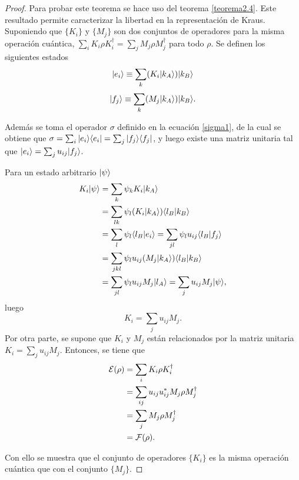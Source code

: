 \begin{proof}
Para probar este teorema se hace uso del teorema {\ref{teorema2.4}}. Este resultado permite caracterizar la libertad en la representación de Kraus. Suponiendo que $\{K_i\}$ y $\{M_j\}$ son dos conjuntos de operadores para la misma operación cuántica, $\sum_i K_i \rho K_i^\dagger= \sum_j M_j \rho M_j^\dagger$ para todo $\rho$. Se definen los siguientes estados
\begin{equation}
    |e_i\rangle\equiv \sum_k (K_i|k_A\rangle)|k_B\rangle
\end{equation}
\begin{equation}
    |f_j\rangle\equiv \sum_k (M_j|k_A\rangle)|k_B\rangle.
\end{equation}


Además se toma el operador $\sigma$ definido en la ecuación {\ref{sigma1}}, de la cual se obtiene que $\sigma=\sum_i|e_i \rangle \langle e_i|=\sum_j |f_j\rangle \langle f_j|$, y luego existe una matriz unitaria tal que $  |e_i\rangle=\sum_{j}u_{ij}|f_j\rangle$.

Para un estado arbitrario $|\psi\rangle$ 
\begin{equation}
    \begin{split}
        K_i|\psi\rangle&=\sum_k \psi_k K_i|k_A\rangle\\
                   &= \sum_{lk}\psi_l(K_i|k_A\rangle)\langle l_B |k_B\rangle\\
                   &=\sum_{l}\psi_l\langle l_B| e_i\rangle=\sum_{jl}\psi_l u_{ij}\langle l_B|f_j\rangle\\
                   &=\sum_{jkl}\psi_l u_{ij}(M_j|k_A\rangle)\langle l_B|k_B\rangle\\
                   &=\sum_{jl}\psi_l u_{ij}M_j|l_A\rangle=\sum_j u_{ij} M_j |\psi\rangle,\\
    \end{split}
\end{equation} luego \[K_i=\sum_j u_{ij}M_j.\]Por otra parte, se supone que $K_i$ y $M_j$ están relacionados por la matriz unitaria $K_i=\sum_j u_{ij}M_j$. Entonces, se tiene que
\begin{equation}
    \begin{split}
        \mathcal{E}(\rho)&=\sum_i  K_i\rho K_i^\dagger\\
            &=\sum_{ij} u_{ij}u_{ij}^*M_j\rho M_j^\dagger\\
            &=\sum_j M_j\rho M_j^\dagger\\
            &=\mathcal{F}(\rho).
    \end{split}
\end{equation}

Con ello se muestra que el conjunto de operadores $\{K_i\}$ es la misma operación cuántica que con el conjunto $\{M_j\}$.
\end{proof}

